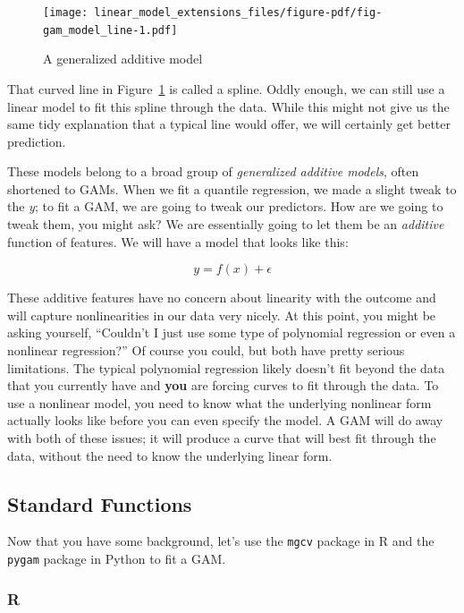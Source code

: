 \documentclass[
  letterpaper,
]{krantz}
\begin{document}
\begin{figure}

{\centering \texttt{[image: linear\_model\_extensions\_files/figure-pdf/fig-gam\_model\_line-1.pdf]}

}

\caption{\label{fig-gam_model_line}A generalized additive model}

\end{figure}

That curved line in Figure~\ref{fig-gam_model_line} is called a spline.
Oddly enough, we can still use a linear model to fit this spline through
the data. While this might not give us the same tidy explanation that a
typical line would offer, we will certainly get better prediction.

These models belong to a broad group of \emph{generalized additive
models}, often shortened to GAMs. When we fit a quantile regression, we
made a slight tweak to the \emph{y}; to fit a GAM, we are going to tweak
our predictors. How are we going to tweak them, you might ask? We are
essentially going to let them be an \emph{additive} function of
features. We will have a model that looks like this:

\[
y = f(x) + \epsilon
\]

These additive features have no concern about linearity with the outcome
and will capture nonlinearities in our data very nicely. At this point,
you might be asking yourself, ``Couldn't I just use some type of
polynomial regression or even a nonlinear regression?'' Of course you
could, but both have pretty serious limitations. The typical polynomial
regression likely doesn't fit beyond the data that you currently have
and \textbf{you} are forcing curves to fit through the data. To use a
nonlinear model, you need to know what the underlying nonlinear form
actually looks like before you can even specify the model. A GAM will do
away with both of these issues; it will produce a curve that will best
fit through the data, without the need to know the underlying linear
form.

\subsection{Standard Functions}\label{standard-functions-3}

Now that you have some background, let's use the \texttt{mgcv} package
in R and the \texttt{pygam} package in Python to fit a GAM.

\subsubsection{R}
\end{document}
